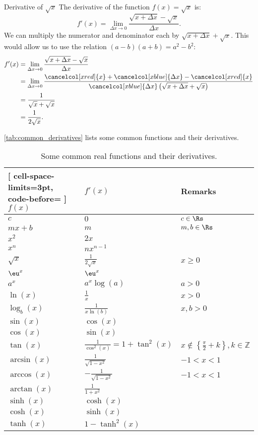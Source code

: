 \begin{example}{Derivative of $\sqrt{x}$}{}
  The derivative of the function $f(x)=\sqrt{x}$ is:
  \[
    f'(x) = \lim\limits_{\Delta x\to 0}\frac{\sqrt{x+\Delta x}-\sqrt{x}}{\Delta x}.
  \]
  We can multiply the numerator and denominator each by $\sqrt{x+\Delta x}+\sqrt{x}$. This would allow us to use the relation $(a-b)(a+b)=a^{2}-b^{2}$:
  \begin{align*}
    f'(x) &= \lim\limits_{\Delta x\to 0}\frac{\sqrt{x+\Delta x}-\sqrt{x}}{\Delta x}\\
          &= \lim\limits_{\Delta x\to 0}\frac{\cancelcol[xred]{x}+\cancelcol[xblue]{\Delta x}-\cancelcol[xred]{x}}{\cancelcol[xblue]{\Delta x}\left(\sqrt{x+\Delta x}+\sqrt{x}\right)}\\
          &= \frac{1}{\sqrt{x}+\sqrt{x}}\\
          &= \frac{1}{2\sqrt{x}}.
  \end{align*}
\end{example}

\autoref{tab:common_derivatives} lists some common functions and their derivatives.
\begin{table}[htpb]
	\centering
	\caption{Some common real functions and their derivatives.}
	\label{tab:common_derivatives}
	\begin{NiceTabular}{lll}[
			cell-space-limits=3pt, code-before= 
		]
		\toprule
    \RowStyle{\bfseries} $f(x)$ & $f'(x)$ & Remarks\\
		\midrule
    $c$ & $0$ & $c\in\Rs$\\
    $mx+b$ & $m$ & $m,b\in\Rs$\\
    $x^{2}$ & $2x$ & \\
    $x^{n}$ & $nx^{n-1}$ & \\
    $\sqrt{x}$ & $\frac{1}{2\sqrt{x}}$ & $x\geq0$\\
    $\eu^{x}$ & $\eu^{x}$ &\\
    $a^{x}$ & $a^{x}\log(a)$ & $a>0$\\
    $\ln(x)$ & $\frac{1}{x}$ & $x>0$\\
    $\log_{b}(x)$ & $\frac{1}{x\ln(b)}$ & $x,b>0$\\
    $\sin(x)$ & $\cos(x)$ & \\
    $\cos(x)$ & $\sin(x)$ & \\
    $\tan(x)$ & $\frac{1}{\cos^{2}(x)}=1+\tan^{2}(x)$ & $x\notin\left\{\frac{\pi}{2}+k\right\},k\in\mathbb{Z}$\\
    $\arcsin(x)$ & $\frac{1}{\sqrt{1-x^{2}}}$ & $-1<x<1$\\
    $\arccos(x)$ & $-\frac{1}{\sqrt{1-x^{2}}}$ & $-1<x<1$ \\
    $\arctan(x)$ & $\frac{1}{1+x^{2}}$ & \\
    $\sinh(x)$ & $\cosh(x)$ & \\
    $\cosh(x)$ & $\sinh(x)$ & \\
    $\tanh(x)$ & $1-\tanh^{2}(x)$ & \\
		\bottomrule
	\end{NiceTabular}
\end{table}

